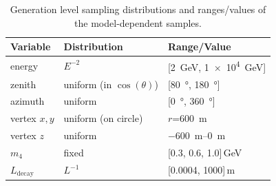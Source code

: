 \begin{table}[H]
    \centering
    \begin{tabular} { lll }
        \hline \hline 
        \textbf{Variable} & \textbf{Distribution} & \textbf{Range/Value} \\
        \hline \hline 
        energy & $E^{-2}$ & [\SI{2}{\GeV}, \SI{1e4}{\GeV}] \\
        zenith & uniform (in $\cos(\theta)$) & [\SI{80}{\degree}, \SI{180}{\degree}] \\
        azimuth & uniform & [\SI{0}{\degree}, \SI{360}{\degree}] \\
        vertex $x,y$ & uniform (on circle) & $r$=\SI{600}{\metre} \\
        vertex $z$ & uniform & \SIrange{-600}{0}{\metre} \\
        $m_\mathrm{4}$ & fixed & [0.3, 0.6, 1.0]\,\si{\GeV} \\
        $L_\mathrm{decay}$ & $L^{-1}$ & [0.0004, 1000]\,\si{\metre} \\
        \hline
    \end{tabular}
    \caption[Model-dependent simulation sampling distributions]{Generation level sampling distributions and ranges/values of the model-dependent samples.}
\end{table}

